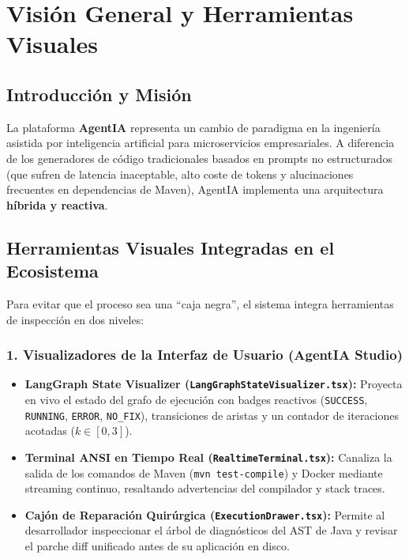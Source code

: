\documentclass[11pt,a4paper]{report}
\begin{document}
\tableofcontents
\newpage

\chapter{Visión General y Herramientas Visuales}

\section{Introducción y Misión}
La plataforma \textbf{AgentIA} representa un cambio de paradigma en la ingeniería asistida por inteligencia artificial para microservicios empresariales. A diferencia de los generadores de código tradicionales basados en prompts no estructurados (que sufren de latencia inaceptable, alto coste de tokens y alucinaciones frecuentes en dependencias de Maven), AgentIA implementa una arquitectura \textbf{híbrida y reactiva}.

\section{Herramientas Visuales Integradas en el Ecosistema}
Para evitar que el proceso sea una ``caja negra'', el sistema integra herramientas de inspección en dos niveles:

\subsection{1. Visualizadores de la Interfaz de Usuario (AgentIA Studio)}
\begin{itemize}[leftmargin=1.5cm]
    \item \textbf{LangGraph State Visualizer (\texttt{LangGraphStateVisualizer.tsx}):} Proyecta en vivo el estado del grafo de ejecución con badges reactivos (\texttt{SUCCESS}, \texttt{RUNNING}, \texttt{ERROR}, \texttt{NO\_FIX}), transiciones de aristas y un contador de iteraciones acotadas ($k \in [0, 3]$).
    \item \textbf{Terminal ANSI en Tiempo Real (\texttt{RealtimeTerminal.tsx}):} Canaliza la salida de los comandos de Maven (\texttt{mvn test-compile}) y Docker mediante streaming continuo, resaltando advertencias del compilador y stack traces.
    \item \textbf{Cajón de Reparación Quirúrgica (\texttt{ExecutionDrawer.tsx}):} Permite al desarrollador inspeccionar el árbol de diagnósticos del AST de Java y revisar el parche diff unificado antes de su aplicación en disco.
\end{itemize}
\end{document}
